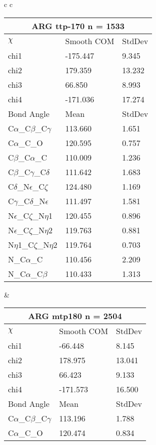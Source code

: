 \begin{longtable}{ c c }

  \begin{tabular}{ l l l }
  \toprule
  \multicolumn{3}{c}{ARG \textbf{ttp-170} n = 1533} \\ \toprule
  $\chi$       & Smooth COM & StdDev \\ \midrule
  chi1 & -175.447 & 9.345 \\ 
  chi2 & 179.359 & 13.232 \\ 
  chi3 & 66.850 & 8.993 \\ 
  chi4 & -171.036 & 17.274 \\ \midrule
  Bond Angle   & Mean     & StdDev \\ \midrule
  C$\alpha$\_C$\beta$\_C$\gamma$ & 113.660 & 1.651\\
  C$\alpha$\_C\_O & 120.595 & 0.757\\
  C$\beta$\_C$\alpha$\_C & 110.009 & 1.236\\
  C$\beta$\_C$\gamma$\_C$\delta$ & 111.642 & 1.683\\
  C$\delta$\_N$\epsilon$\_C$\zeta$ & 124.480 & 1.169\\
  C$\gamma$\_C$\delta$\_N$\epsilon$ & 111.497 & 1.581\\
  N$\epsilon$\_C$\zeta$\_N$\eta$1 & 120.455 & 0.896\\
  N$\epsilon$\_C$\zeta$\_N$\eta$2 & 119.763 & 0.881\\
  N$\eta$1\_C$\zeta$\_N$\eta$2 & 119.764 & 0.703\\
  N\_C$\alpha$\_C & 110.456 & 2.209\\
  N\_C$\alpha$\_C$\beta$ & 110.433 & 1.313\\
  \bottomrule
  \end{tabular}
  &
  \begin{tabular}{ l l l }
  \toprule
  \multicolumn{3}{c}{ARG \textbf{mtp180} n = 2504} \\ \toprule
  $\chi$       & Smooth COM & StdDev \\ \midrule
  chi1 & -66.448 & 8.145 \\ 
  chi2 & 178.975 & 13.041 \\ 
  chi3 & 66.423 & 9.133 \\ 
  chi4 & -171.573 & 16.500 \\ \midrule
  Bond Angle   & Mean     & StdDev \\ \midrule
  C$\alpha$\_C$\beta$\_C$\gamma$ & 113.196 & 1.788\\
  C$\alpha$\_C\_O & 120.474 & 0.834\\

\end{tabular}
\end{longtable}
